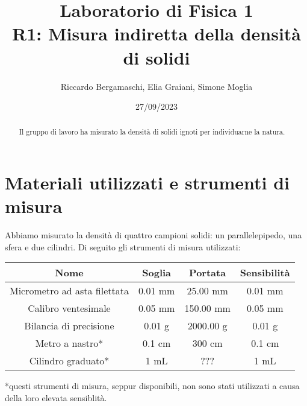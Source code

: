 \documentclass{article}
\title{
    Laboratorio di Fisica 1\\
    R1: Misura indiretta della densità di solidi
}
\author{Riccardo Bergamaschi, Elia Graiani, Simone Moglia}
\date{27/09/2023}
\begin{document}
\maketitle

\begin{abstract}
    Il gruppo di lavoro ha misurato la densità di solidi ignoti
    per individuarne la natura.
\end{abstract}

\section{Materiali utilizzati e strumenti di misura}
Abbiamo misurato la densità di quattro campioni solidi:
un parallelepipedo, una sfera e due cilindri.
Di seguito gli strumenti di misura utilizzati:

\begin{center}
    \begin{tabular}{ |c|c|c|c| }
        \hline
        Nome & Soglia & Portata & Sensibilità \\
        \hline
        Micrometro ad asta filettata & 0.01 mm & 25.00 mm & 0.01 mm \\
        \hline
        Calibro ventesimale & 0.05 mm & 150.00 mm & 0.05 mm \\
        \hline
        Bilancia di precisione & 0.01 g & 2000.00 g & 0.01 g \\
        \hline
        Metro a nastro* & 0.1 cm & 300 cm & 0.1 cm \\
        \hline
        Cilindro graduato* & 1 mL & ??? & 1 mL \\
        \hline
    \end{tabular}
\end{center}

*questi strumenti di misura, seppur disponibili, non sono stati
utilizzati a causa della loro elevata sensiblità.
\end{document}
